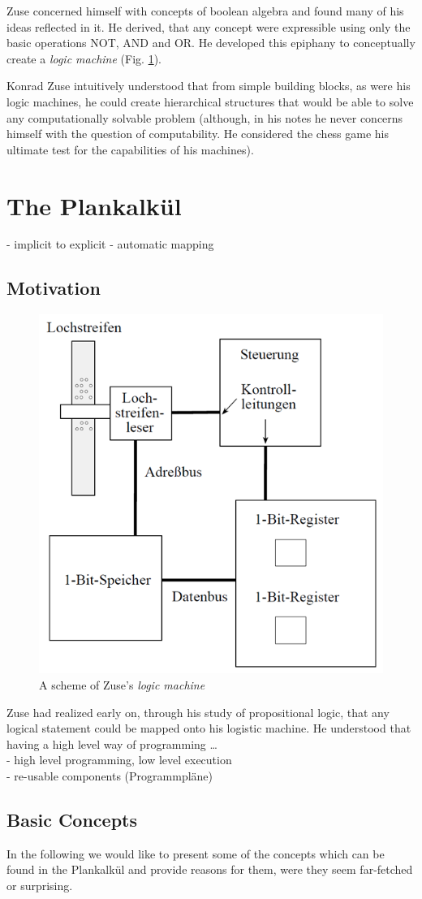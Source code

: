 \documentclass{llncs}
\begin{document}
   Zuse concerned himself with concepts of boolean algebra and found many 
   of his ideas reflected in it. He derived, that any concept were expressible
   using only the basic operations NOT, AND and OR. He developed this epiphany 
   to conceptually create a \emph{logic machine} (Fig. \ref{fig:logicmachine}). 
   
   Konrad Zuse intuitively 
   understood that from simple building blocks, as were his logic machines, 
   he could create hierarchical structures that would be able to solve any 
   computationally solvable problem (although, in his notes he never concerns 
   himself with the question of computability. He considered the chess game his 
   ultimate test for the capabilities of his machines).
 \section{The Plankalkül}
    - implicit to explicit
    - automatic mapping
 \subsection{Motivation}
  \begin{figure}[bt]
    \centering
    \includegraphics[width=0.4\linewidth]{img/logicmachine.png}
    \caption{A scheme of Zuse's \emph{logic machine}\cite{rojas2002plankalkuel}}
    \label{fig:logicmachine}
  \end{figure}

   Zuse had realized early on, through his study of propositional logic, that any 
   logical statement could be mapped onto his logistic machine. He understood that
   having a high level way of programming \dots\\
    - high level programming, low level execution\\
    - re-usable components (Programmpläne)
 \subsection{Basic Concepts}
   In the following we would like to present some of 
   the concepts which can be found in the Plankalkül 
   and provide reasons for them, were they seem far-fetched 
   or surprising.
   
\end{document}
